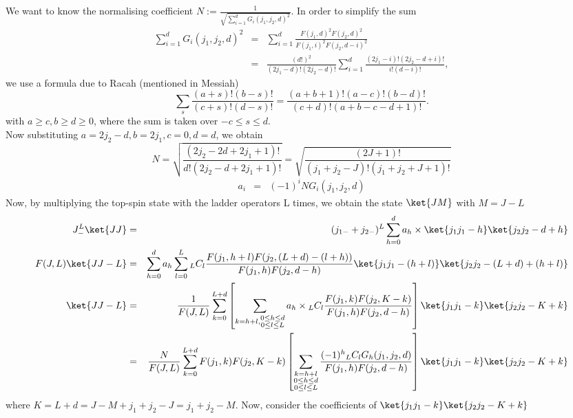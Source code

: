 \documentclass{article}
\begin{document}
{We want to know the normalising coefficient $N := \frac{1}{\sqrt{\sum_{i=1}^{d}G_i(j_1,j_2,d)^2}}$. In order to simplify the sum
\begin{eqnarray}
\sum_{i=1}^{d}G_i(j_1,j_2,d)^2 &=& \sum_{i=1}^{d}\frac{F(j_1,d)^2F(j_2,d)^2}{F(j_1,i)^2F(j_2,d-i)^2} \nonumber \\
 & = & \frac{(d!)^2}{(2j_1-d)!(2j_2-d)!} \sum_{i=1}^{d}\frac{(2j_1-i)!(2j_2-d+i)!}{i!(d-i)!},
\end{eqnarray} 
we use a formula due to Racah (mentioned in Messiah\cite{Messiah})
\begin{equation}
\label{eq:general_binomial_coeff}
\sum_{s} \frac{(a+s)!(b-s)!}{(c+s)!(d-s)!} = \frac{(a+b+1)!(a-c)!(b-d)!}{(c+d)!(a+b-c-d+1)!}.
\end{equation}
with $a\ge c, b\ge d \ge 0$, where the sum is taken over $-c\le s \le d$.\\
Now substituting $a = 2j_2-d, b = 2j_1, c=0, d= d$, we obtain
\begin{equation}
\label{ }
N = \sqrt{\frac{(2j_2-2d+2j_1+1)!}{d!(2j_2-d+2j_1+1)!}} = \sqrt{\frac{(2J+1)!}{(j_1+j_2 -J)!(j_1+j_2+J+1)!}}
\end{equation}
\begin{eqnarray}
a_i & = &  (-1)^iNG_i(j_1,j_2,d)\nonumber
\end{eqnarray}
Now, by multiplying the top-spin state with the ladder operators L times, we obtain the state $\ket{JM}$ with $M=J-L$
\begin{eqnarray}
J_{-}^L\ket{JJ} & = & (j_{1-} + j_{2-})^L\sum_{h=0}^{d}a_h\times \ket{j_1j_1 -h}\ket{j_2j_2-d+h} \nonumber\\
F(J,L)\ket{JJ-L}&=& \sum_{h=0}^{d}a_h\sum_{l=0}^{L}{}_LC_{l}\frac{F(j_1,h+l)F(j_2,(L+d)-(l+h))}{F(j_1,h)F(j_2,d-h)}\ket{j_1j_1 -(h + l)}\ket{j_2j_2 - (L+d) + (h + l)}  \nonumber\\
\ket{JJ-L}&=& \frac{1}{F(J,L)} \sum_{k=0}^{L+d} \left[ \sum_{k=h+l,\substack{0\le h \le d\\0\le l \le L}} a_h \times {}_LC_{l}\frac{F(j_1,k)F(j_2,K-k)}{F(j_1,h)F(j_2,d-h)}\right] \ket{j_1j_1 -k}\ket{j_2j_2 - K + k}  \nonumber\\
         &=& \frac{N}{F(J,L)} \sum_{k=0}^{L+d} F(j_1,k)F(j_2,K-k) \left[ \sum_{\substack{k=h+l\\0\le h \le d\\0\le l \le L}} \frac{ (-1)^h {}_LC_{l}G_h(j_1,j_2,d) }{F(j_1,h)F(j_2,d-h)}\right] \ket{j_1j_1 -k}\ket{j_2j_2 - K + k}  \nonumber
\end{eqnarray}
where $K=L+d = J- M + j_1 + j_2 -J = j_1 +j_2 -M$. Now, consider the coefficients of $\ket{j_1j_1 -k}\ket{j_2j_2 - K + k}$
}
\end{document}
